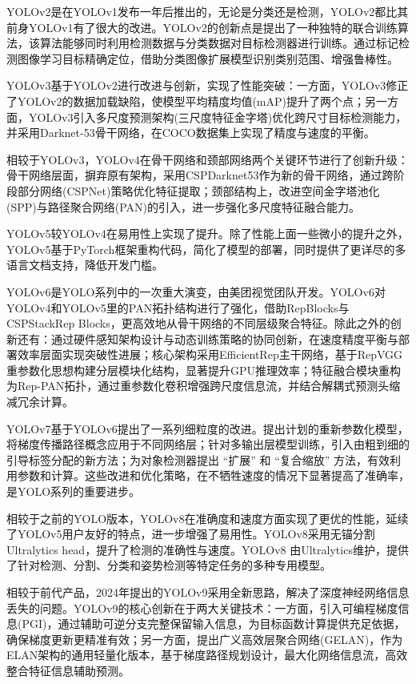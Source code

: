 YOLOv2是在YOLOv1发布一年后推出的\cite{yolov2}，无论是分类还是检测，YOLOv2都比其前身YOLOv1有了很大的改进。YOLOv2的创新点是提出了一种独特的联合训练算法，该算法能够同时利用检测数据与分类数据对目标检测器进行训练。通过标记检测图像学习目标精确定位，借助分类图像扩展模型识别类别范围、增强鲁棒性。

YOLOv3\cite{yolov3}基于YOLOv2进行改进与创新，实现了性能突破：一方面，YOLOv3修正了YOLOv2的数据加载缺陷，使模型平均精度均值(mAP)提升了两个点；另一方面，YOLOv3引入多尺度预测架构(三尺度特征金字塔)优化跨尺寸目标检测能力，并采用Darknet-53骨干网络，在COCO数据集上实现了精度与速度的平衡。

相较于YOLOv3，YOLOv4\cite{yolov4}在骨干网络和颈部网络两个关键环节进行了创新升级：骨干网络层面，摒弃原有架构，采用CSPDarknet53作为新的骨干网络，通过跨阶段部分网络(CSPNet)策略优化特征提取；颈部结构上，改进空间金字塔池化(SPP)与路径聚合网络(PAN)的引入，进一步强化多尺度特征融合能力。

YOLOv5较YOLOv4在易用性上实现了提升。除了性能上面一些微小的提升之外，YOLOv5基于PyTorch框架重构代码，简化了模型的部署，同时提供了更详尽的多语言文档支持，降低开发门槛。

YOLOv6是YOLO系列中的一次重大演变，由美团视觉团队开发\cite{yolov6}。YOLOv6对YOLOv4和YOLOv5里的PAN拓扑结构进行了强化，借助RepBlocks与CSPStackRep Blocks，更高效地从骨干网络的不同层级聚合特征。除此之外的创新还有：通过硬件感知架构设计与动态训练策略的协同创新，在速度精度平衡与部署效率层面实现突破性进展；核心架构采用EfficientRep主干网络，基于RepVGG重参数化思想构建分层模块化结构，显著提升GPU推理效率；特征融合模块重构为Rep-PAN拓扑，通过重参数化卷积增强跨尺度信息流，并结合解耦式预测头缩减冗余计算。

YOLOv7基于YOLOv6提出了一系列细粒度的改进\cite{yolov7}。提出计划的重新参数化模型，将梯度传播路径概念应用于不同网络层；针对多输出层模型训练，引入由粗到细的引导标签分配的新方法；为对象检测器提出 “扩展” 和 “复合缩放” 方法，有效利用参数和计算。这些改进和优化策略，在不牺牲速度的情况下显著提高了准确率，是YOLO系列的重要进步。

相较于之前的YOLO版本，YOLOv8在准确度和速度方面实现了更优的性能，延续了YOLOv5用户友好的特点，进一步增强了易用性。YOLOv8采用无锚分割Ultralytics head，提升了检测的准确性与速度。YOLOv8 由Ultralytics维护，提供了针对检测、分割、分类和姿势检测等特定任务的多种专用模型。

相较于前代产品，2024年提出的YOLOv9采用全新思路，解决了深度神经网络信息丢失的问题\cite{yolov9}。YOLOv9的核心创新在于两大关键技术：一方面，引入可编程梯度信息(PGI)，通过辅助可逆分支完整保留输入信息，为目标函数计算提供充足依据，确保梯度更新更精准有效；另一方面，提出广义高效层聚合网络(GELAN)，作为ELAN架构的通用轻量化版本，基于梯度路径规划设计，最大化网络信息流，高效整合特征信息辅助预测。

